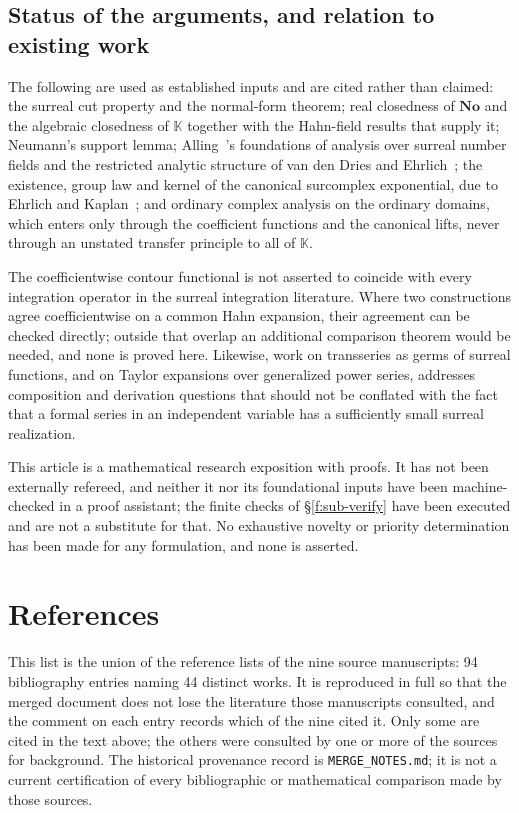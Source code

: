 \documentclass[11pt,a4paper]{article}
\numberwithin{equation}{section}
\theoremstyle{definition}
\theoremstyle{remark}
\theoremstyle{plain}
\newcommand{\K}{\mathbb K}
\newcommand{\No}{\mathbf{No}}
\begin{document}
\subsection{Status of the arguments, and relation to existing work}
\label{f:sub-status}

The following are used as established inputs and are cited rather than
claimed: the surreal cut property and the normal-form theorem; real
closedness of $\No$ and the algebraic closedness of $\K$ together with
the Hahn-field results that supply it; Neumann's support lemma; Alling~\cite{Alling}'s
foundations of analysis over surreal number fields and the restricted
analytic structure of van den Dries and Ehrlich~\cite{vdDE}; the existence, group
law and kernel of the canonical surcomplex exponential, due to Ehrlich
and Kaplan~\cite[Theorem~11.1]{EK}; and ordinary complex analysis on the ordinary domains, which
enters only through the coefficient functions and the canonical lifts,
never through an unstated transfer principle to all of $\K$.

The coefficientwise contour functional is not asserted to coincide with
every integration operator in the surreal integration literature.  Where
two constructions agree coefficientwise on a common Hahn expansion,
their agreement can be checked directly; outside that overlap an
additional comparison theorem would be needed, and none is proved here.
Likewise, work on transseries as germs of surreal functions, and on
Taylor expansions over generalized power series, addresses composition
and derivation questions that should not be conflated with the fact that
a formal series in an independent variable has a sufficiently small
surreal realization.

This article is a mathematical research exposition with proofs.  It has
not been externally refereed, and neither it nor its foundational inputs
have been machine-checked in a proof assistant; the finite checks of
\S\ref{f:sub-verify} have been executed and are not a substitute for
that.  No exhaustive novelty or priority determination has been made for
any formulation, and none is asserted.
\clearpage
\section*{References}

This list is the union of the reference lists of the nine source
manuscripts: 94 bibliography entries naming 44 distinct works.  It is
reproduced in full so that the merged document does not lose the
literature those manuscripts consulted, and the comment on each entry
records which of the nine cited it.
Only some are cited in the text above; the others were consulted by one or
more of the sources for background. The historical provenance record
is \texttt{MERGE\_NOTES.md}; it is not a current certification of every
bibliographic or mathematical comparison made by those sources.
\end{document}
